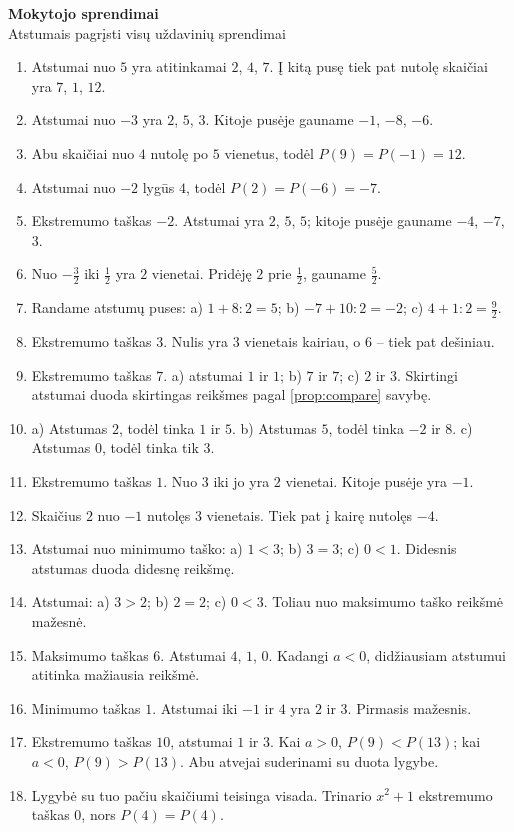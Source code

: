 \documentclass[11pt,a4paper]{scrartcl}
\newcommand{\pagetitle}[2]{\begin{center}{\Large\bfseries #1}\\[3pt]{\small #2}\end{center}\vspace{3mm}}
\begin{document}
\newpage\pagetitle{Mokytojo sprendimai}{Atstumais pagrįsti visų uždavinių sprendimai}\begin{enumerate}
\item Atstumai nuo $5$ yra atitinkamai $2$, $4$, $7$. Į kitą pusę tiek pat nutolę skaičiai yra $7$, $1$, $12$.
\item Atstumai nuo $-3$ yra $2$, $5$, $3$. Kitoje pusėje gauname $-1$, $-8$, $-6$.
\item Abu skaičiai nuo $4$ nutolę po $5$ vienetus, todėl $P(9)=P(-1)=12$.
\item Atstumai nuo $-2$ lygūs $4$, todėl $P(2)=P(-6)=-7$.
\item Ekstremumo taškas $-2$. Atstumai yra $2$, $5$, $5$; kitoje pusėje gauname $-4$, $-7$, $3$.
\item Nuo $-\frac32$ iki $\frac12$ yra $2$ vienetai. Pridėję $2$ prie $\frac12$, gauname $\frac52$.
\item Randame atstumų puses: a) $1+8:2=5$; b) $-7+10:2=-2$; c) $4+1:2=\frac92$.
\item Ekstremumo taškas $3$. Nulis yra $3$ vienetais kairiau, o $6$ -- tiek pat dešiniau.
\item Ekstremumo taškas $7$. a) atstumai $1$ ir $1$; b) $7$ ir $7$; c) $2$ ir $3$. Skirtingi atstumai duoda skirtingas reikšmes pagal \ref{prop:compare} savybę.
\item a) Atstumas $2$, todėl tinka $1$ ir $5$. b) Atstumas $5$, todėl tinka $-2$ ir $8$. c) Atstumas $0$, todėl tinka tik $3$.
\item Ekstremumo taškas $1$. Nuo $3$ iki jo yra $2$ vienetai. Kitoje pusėje yra $-1$.
\item Skaičius $2$ nuo $-1$ nutolęs $3$ vienetais. Tiek pat į kairę nutolęs $-4$.
\item Atstumai nuo minimumo taško: a) $1<3$; b) $3=3$; c) $0<1$. Didesnis atstumas duoda didesnę reikšmę.
\item Atstumai: a) $3>2$; b) $2=2$; c) $0<3$. Toliau nuo maksimumo taško reikšmė mažesnė.
\item Maksimumo taškas $6$. Atstumai $4$, $1$, $0$. Kadangi $a<0$, didžiausiam atstumui atitinka mažiausia reikšmė.
\item Minimumo taškas $1$. Atstumai iki $-1$ ir $4$ yra $2$ ir $3$. Pirmasis mažesnis.
\item Ekstremumo taškas $10$, atstumai $1$ ir $3$. Kai $a>0$, $P(9)<P(13)$; kai $a<0$, $P(9)>P(13)$. Abu atvejai suderinami su duota lygybe.
\item Lygybė su tuo pačiu skaičiumi teisinga visada. Trinario $x^2+1$ ekstremumo taškas $0$, nors $P(4)=P(4)$.

\end{enumerate}
\end{document}
